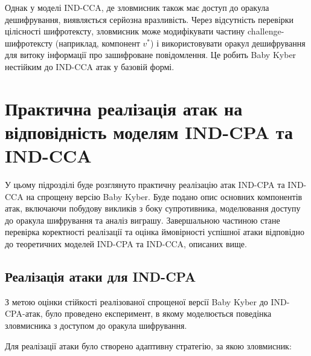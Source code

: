 Однак у моделі IND-CCA, де зловмисник також має доступ до оракула дешифрування, виявляється серйозна вразливість. Через відсутність перевірки цілісності шифротексту, зловмисник може модифікувати частину challenge-шифротексту (наприклад, компонент $v^*$) і використовувати оракул дешифрування для витоку інформації про зашифроване повідомлення. Це робить Baby Kyber нестійким до IND-CCA атак у базовій формі.


\section{Практична реалізація атак на відповідність моделям IND-CPA та IND-CCA}

У цьому підрозділі буде розглянуто практичну реалізацію атак IND-CPA та IND-CCA на спрощену версію Baby Kyber.  Буде подано опис основних компонентів атак, включаючи побудову викликів з боку супротивника, моделювання доступу до оракула шифрування та аналіз виграшу. Завершальною частиною стане перевірка коректності реалізації та оцінка ймовірності успішної атаки відповідно до теоретичних моделей IND-CPA та IND-CCA, описаних вище.

\subsection*{Реалізація атаки для IND-CPA}

З метою оцінки стійкості реалізованої спрощеної версії Baby Kyber до IND-CPA-атак, було проведено експеримент, в якому моделюється поведінка зловмисника з доступом до оракула шифрування.

Для реалізації атаки було створено адаптивну стратегію, за якою зловмисник:

